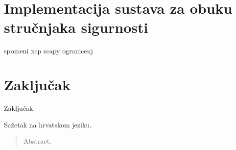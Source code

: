 \documentclass[times, utf8, diplomski, numeric]{fer}
\begin{document}
\chapter{Implementacija sustava za obuku stručnjaka sigurnosti}

spomeni xcp scapy ogranicenj
\chapter{Zaključak}
 Zaključak.





\begin{sazetak}
Sažetak na hrvatskom jeziku.

\end{sazetak}

\begin{abstract}
Abstract.

\end{abstract}
\end{document}
